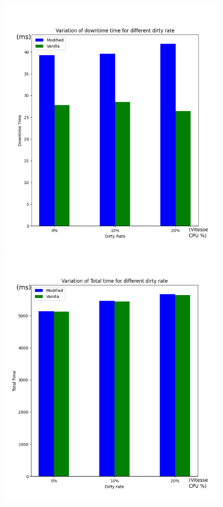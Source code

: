 \begin{description}
\begin{figure}[H]
\begin{minipage}{0.48\textwidth}
\centering
\includegraphics[width=1\linewidth]{include/down_rate.png}
\end{minipage}\hfill
\begin{minipage}{0.48\textwidth}
\centering
\includegraphics[width=1\linewidth]{include/total_rate.png}

\end{minipage}
\end{figure}
\end{description}
